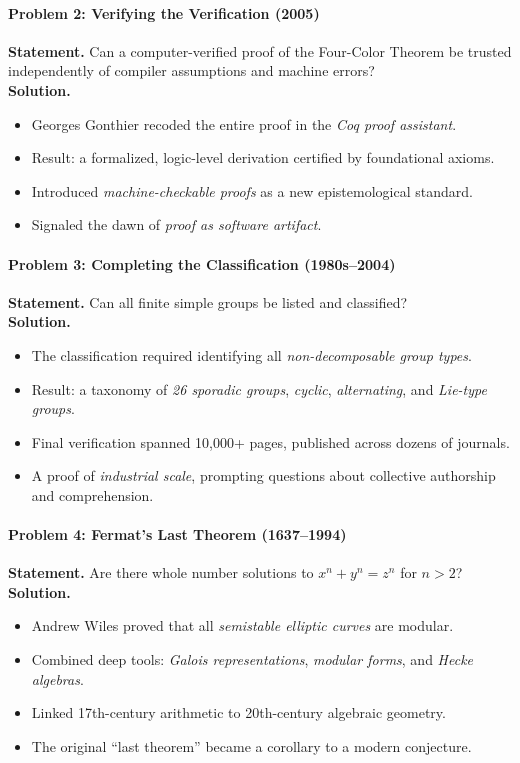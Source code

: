 \documentclass[9pt]{article}
\begin{document}
\paragraph{Problem 2: Verifying the Verification (2005)}
\textbf{Statement.} Can a computer-verified proof of the Four-Color Theorem be trusted independently of compiler assumptions and machine errors? \\
\textbf{Solution.}
\begin{itemize}
  \item Georges Gonthier recoded the entire proof in the \textit{Coq proof assistant}.
  \item Result: a formalized, logic-level derivation certified by foundational axioms.
  \item Introduced \textit{machine-checkable proofs} as a new epistemological standard.
  \item Signaled the dawn of \textit{proof as software artifact}.
\end{itemize}

\paragraph{Problem 3: Completing the Classification (1980s--2004)}
\textbf{Statement.} Can all finite simple groups be listed and classified? \\
\textbf{Solution.}
\begin{itemize}
  \item The classification required identifying all \textit{non-decomposable group types}.
  \item Result: a taxonomy of \textit{26 sporadic groups}, \textit{cyclic}, \textit{alternating}, and \textit{Lie-type groups}.
  \item Final verification spanned 10{,}000+ pages, published across dozens of journals.
  \item A proof of \textit{industrial scale}, prompting questions about collective authorship and comprehension.
\end{itemize}

\paragraph{Problem 4: Fermat’s Last Theorem (1637--1994)}
\textbf{Statement.} Are there whole number solutions to \( x^n + y^n = z^n \) for \( n > 2 \)? \\
\textbf{Solution.}
\begin{itemize}
  \item Andrew Wiles proved that all \textit{semistable elliptic curves} are modular.
  \item Combined deep tools: \textit{Galois representations}, \textit{modular forms}, and \textit{Hecke algebras}.
  \item Linked 17th-century arithmetic to 20th-century algebraic geometry.
  \item The original ``last theorem'' became a corollary to a modern conjecture.
\end{itemize}
\end{document}
